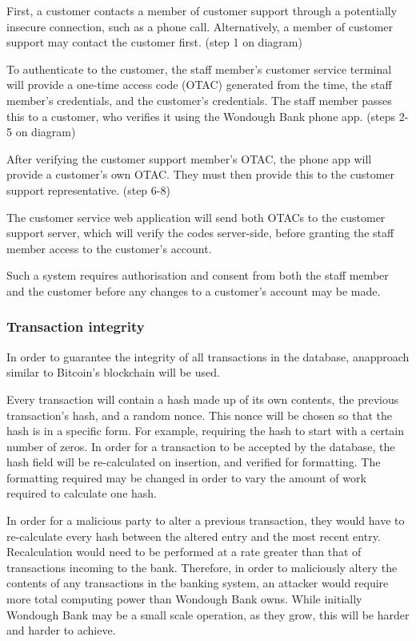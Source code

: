 First, a customer contacts a member of customer support through a potentially insecure connection, such as a phone call. Alternatively, a member of customer support may contact the customer first. (step 1 on diagram)

To authenticate to the customer, the staff member's customer service terminal will provide a one-time access code (OTAC) generated from the time, the staff member's credentials, and the customer's credentials. The staff member passes this to a customer, who verifies it using the Wondough Bank phone app. (steps 2-5 on diagram)

After verifying the customer support member's OTAC, the phone app will provide a customer's own OTAC. They must then provide this to the customer support representative. (step 6-8)

The customer service web application will send both OTACs to the customer support server, which will verify the codes server-side, before granting the staff member access to the customer's account.

Such a system requires authorisation and consent from both the staff member and the customer before any changes to a customer's account may be made.

\subsubsection{Transaction integrity}

In order to guarantee the integrity of all transactions in the database, anapproach similar to Bitcoin's blockchain \cite{blockchain} will be used.

Every transaction will contain a hash made up of its own contents, the previous transaction's hash, and a random nonce. This nonce will be chosen so that the hash is in a specific form. For example, requiring the hash to start with a certain number of zeros. In order for a transaction to be accepted by the database, the hash field will be re-calculated on insertion, and verified for formatting. The formatting required may be changed in order to vary the amount of work required to calculate one hash.

In order for a malicious party to alter a previous transaction, they would have to re-calculate every hash between the altered entry and the most recent entry. Recalculation would need to be performed at a rate greater than that of transactions incoming to the bank. Therefore, in order to maliciously altery the contents of any transactions in the banking system, an attacker would require more total computing power than Wondough Bank owns. While initially Wondough Bank may be a small scale operation, as they grow, this will be harder and harder to achieve.

